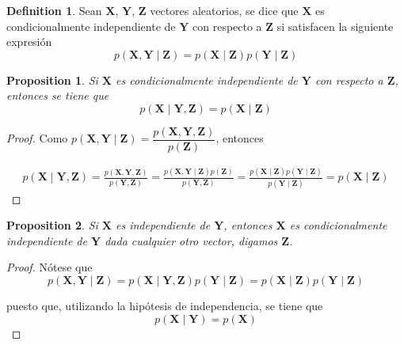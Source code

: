 \documentclass[
  spanish,
  letter]{book}
\newtheorem{proposition}{Proposition}[chapter]
\theoremstyle{definition}
\newtheorem{definition}{Definition}[chapter]
\theoremstyle{definition}
\theoremstyle{definition}
\theoremstyle{remark}
\begin{document}
\begin{definition}
\protect\hypertarget{def:unnamed-chunk-7}{}{\label{def:unnamed-chunk-7} }Sean \(\mathbf{X}\), \(\mathbf{Y}\), \(\mathbf{Z}\) vectores aleatorios, se dice que \(\mathbf{X}\) es condicionalmente independiente de \(\mathbf{Y}\) con respecto a \(\mathbf{Z}\) si satisfacen la siguiente expresión
\begin{equation}
p(\mathbf{X},\mathbf{Y} \mid \mathbf{Z})=p(\mathbf{X} \mid \mathbf{Z})p(\mathbf{Y} \mid \mathbf{Z})
\end{equation}
\end{definition}

\begin{proposition}
\protect\hypertarget{prp:unnamed-chunk-8}{}{\label{prp:unnamed-chunk-8} }Si \(\mathbf{X}\) es condicionalmente independiente de \(\mathbf{Y}\) con respecto a \(\mathbf{Z}\), entonces se tiene que
\begin{equation}
p(\mathbf{X} \mid \mathbf{Y},\mathbf{Z})=p(\mathbf{X} \mid \mathbf{Z})
\end{equation}
\end{proposition}

\begin{proof}
\iffalse{} {Proof. } \fi{}Como \(p(\mathbf{X},\mathbf{Y} \mid \mathbf{Z})=\dfrac{p(\mathbf{X},\mathbf{Y},\mathbf{Z})}{p(\mathbf{Z})}\), entonces

\begin{align*}
p(\mathbf{X} \mid \mathbf{Y},\mathbf{Z})=\frac{p(\mathbf{X},\mathbf{Y},\mathbf{Z})}{p(\mathbf{Y},\mathbf{Z})}
=\frac{p(\mathbf{X},\mathbf{Y} \mid \mathbf{Z})p(\mathbf{Z})}{p(\mathbf{Y},\mathbf{Z})}
=\frac{p(\mathbf{X} \mid \mathbf{Z})p(\mathbf{Y} \mid \mathbf{Z})}{p(\mathbf{Y} \mid \mathbf{Z})}=p(\mathbf{X} \mid \mathbf{Z})
\end{align*}
\end{proof}

\begin{proposition}
\protect\hypertarget{prp:unnamed-chunk-10}{}{\label{prp:unnamed-chunk-10} }Si \(\mathbf{X}\) es independiente de \(\mathbf{Y}\), entonces \(\mathbf{X}\) es condicionalmente independiente de \(\mathbf{Y}\) dada cualquier otro vector, digamos \(\mathbf{Z}\).
\end{proposition}

\begin{proof}
\iffalse{} {Proof. } \fi{}Nótese que
\begin{equation*}
p(\mathbf{X},\mathbf{Y}\mid \mathbf{Z})=p(\mathbf{X} \mid \mathbf{Y},\mathbf{Z})p(\mathbf{Y} \mid \mathbf{Z})=p(\mathbf{X} \mid \mathbf{Z})p(\mathbf{Y} \mid \mathbf{Z})
\end{equation*}

puesto que, utilizando la hipótesis de independencia, se tiene que
\begin{equation*}
p(\mathbf{X} \mid \mathbf{Y})=p(\mathbf{X})
\end{equation*}
\end{proof}
\end{document}
